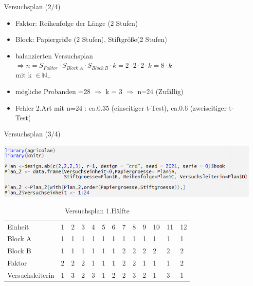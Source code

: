 \documentclass[ ngerman, fontsize= 10pt, headings=big, titlepage=true, xcolor=dvipsnames]{beamer}
\begin{document}
\begin{frame}{Versuchsplan (2/4)}
	
	
	\begin{itemize}
		\item Faktor: Reihenfolge der Länge (2 Stufen)
		\item Block: Papiergröße (2 Stufen), Stiftgröße(2 Stufen)	
		\item balanzierten Versuchsplan\\
		 $\Rightarrow n = S_{Faktor} \cdot S_{Block\ A} \cdot  S_{Block\ B} \cdot k =2 \cdot 2\cdot 2\cdot k = 8\cdot k$ \\
		 mit k $\in \mathbb{N}_+$
		
		\item mögliche Probanden =28 $\Rightarrow$ k = 3 $\Rightarrow$ n=24 (Zufällig)
		\item Fehler 2.Art mit n=24 : ca.0.35 (einseitiger t-Test), ca.0.6 (zweiseitiger t-Test)
		
		
	\end{itemize}
	
\end{frame}
\begin{frame}[fragile]{Versuchsplan (3/4)}
	
\includegraphics[scale=0.7]{Code_Versuchsplan.png}

{\small
\begin{table}[hb]
	\caption{Versuchsplan 1.Hälfte}
	\centering
	\begin{tabular}[b]{l||l|l|l|l|l|l|l|l|l|l|l|l}
		\hline
		Einheit & 1 & 2 & 3 & 4 & 5 & 6 & 7 & 8 & 9 & 10 & 11 & 12\\
		\hhline{=============}
		Block A & 1 & 1 & 1 & 1 & 1 & 1 & 1 & 1 & 1 & 1 & 1 & 1\\
		\hline
		Block B & 1 & 1 & 1 & 1 & 1 & 1 & 2 & 2 & 2 & 2 & 2 & 2\\
		\hline
		Faktor & 2 & 2 & 2 & 1 & 1 & 1 & 2 & 2 & 1 & 1 & 1 & 2\\
		\hhline{=============}
		{\tiny Versuchsleiterin} & 1 & 3 & 2 & 3 & 1 & 2 & 2 & 3 & 2 & 1 & 3 & 1\\
		\hline
	\end{tabular}
\end{table}}

\end{frame}
\end{document}
